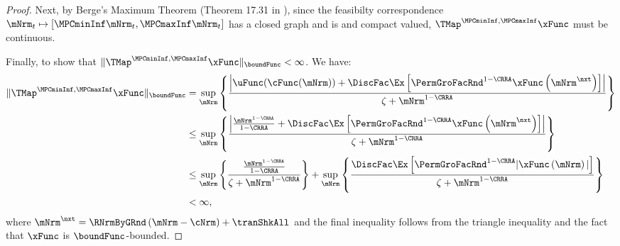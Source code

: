 \documentclass[\econtexRoot/BufferStockTheory]{subfiles}
\begin{document}
\begin{proof}
                                            
Next, by Berge's Maximum Theorem (Theorem 17.31 in \cite{Aliprantis2005}), since the feasibilty correspondence $\mNrm_{t}\mapsto [\MPCminInf \mNrm_{t}, \MPCmaxInf \mNrm_{t}]$ has a closed graph and is and compact valued, $\TMap^{\MPCminInf, \MPCmaxInf}{\mathfrak{\xFunc}}$ must be continuous.


Finally, to show that $\Vert \TMap^{\MPCminInf, \MPCmaxInf}{\mathfrak{\xFunc}}\Vert_{\boundFunc}<\infty$.
We have:
%
%
\begin{align}
\Vert \TMap^{\MPCminInf, \MPCmaxInf}{\mathfrak{\xFunc}}\Vert_{\boundFunc} & = \sup_{\mNrm} \left\{\frac{\left| \uFunc(\cFunc(\mNrm)) + \DiscFac \Ex\left[ {\PermGroFacRnd}^{1-\CRRA }{\mathfrak{\xFunc}} \left( {\mNrm^{\nxt}}\right) \right] \right|}{\zeta + \mNrm^{1-\CRRA}}\right\} \\
& \leq  \sup_{\mNrm} \left\{\frac{\left| \frac{\mNrm^{1-\CRRA}}{1-\CRRA} + \DiscFac \Ex\left[ {\PermGroFacRnd}^{1-\CRRA }{\mathfrak{\xFunc}} \left( {\mNrm^{\nxt}}\right) \right] \right|}{\zeta + \mNrm^{1-\CRRA}}\right\} \\ 
& \leq \sup_{\mNrm} \left\{\frac{\frac{\mNrm^{1-\CRRA}}{1-\CRRA}}{\zeta + \mNrm^{1-\CRRA}}\right\} + \sup_{\mNrm} \left\{\frac{\DiscFac \Ex\left[ {\PermGroFacRnd}^{1-\CRRA }{\vert \mathfrak{\xFunc}} \left( {\mNrm}\right)\vert  \right]}{\zeta + \mNrm^{1-\CRRA}}\right\}\\
& <\infty, 
\end{align}
%
where ${\mNrm}^{\nxt} = \RNrmByGRnd\left(\mNrm - \cNrm\right) + \tranShkAll$ and the final inequality follows from the triangle inequality and the fact that $\xFunc$ is $\boundFunc$-bounded.

                                           
\end{proof}
\end{document}
